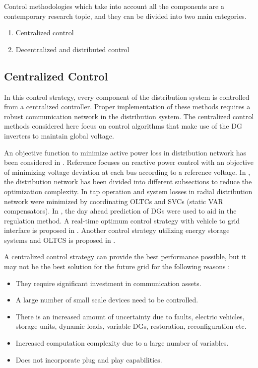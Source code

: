 Control methodologies which take into account all the components are a contemporary research topic, and they can be divided into two main categories. 
\begin{enumerate}
    \item Centralized control
    \item Decentralized and distributed control
\end{enumerate}

\subsection{Centralized Control}
In this control strategy, every component of the distribution system is controlled from a centralized controller. Proper implementation of these methods requires a robust communication network in the distribution system. The centralized control methods considered here focus on control algorithms that make use of the DG inverters to maintain global voltage. 

An objective function to minimize active power loss in distribution network has been considered in \cite{CE_VC_1}. Reference \cite{CE_VC_2} focuses on reactive power control with an objective of minimizing voltage deviation at each bus according to a reference voltage. In \cite{CE_VC_3}, the distribution network has been divided into different subsections to reduce the optimization complexity. In \cite{CE_VC_4} tap operation and system losses in radial distribution network were minimized by coordinating OLTCs and SVCs (static VAR compensators). In \cite{CE_VC_5}, the day ahead prediction of DGs were used to aid in the regulation method. A real-time optimum control strategy with vehicle to grid interface is proposed in \cite{CE_VC_6}. Another control strategy utilizing energy storage systems and OLTCS is proposed in \cite{CE_VC_7}.

A centralized control strategy can provide the best performance possible, but it may not be the best solution for the future grid for the following reasons \cite{VC_1}:
\begin{itemize}
    \item They require significant investment in communication assets.
    \item A large number of small scale devices need to be controlled.
    \item There is an increased amount of uncertainty due to faults, electric vehicles, storage units, dynamic loads, variable DGs, restoration, reconfiguration etc.
    \item Increased computation complexity due to a large number of variables.
    \item Does not incorporate plug and play capabilities.
\end{itemize}

